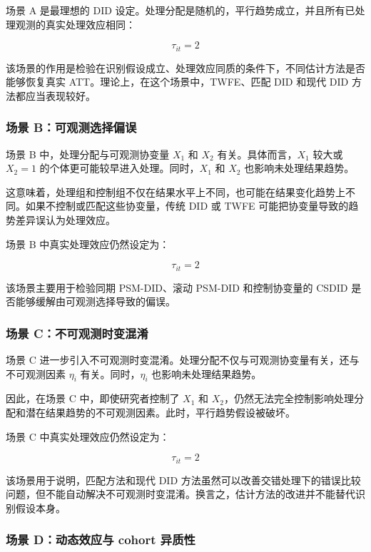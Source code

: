 \documentclass[
  fontset=windows]{ctexart}
\begin{document}
场景 A 是最理想的 DID
设定。处理分配是随机的，平行趋势成立，并且所有已处理观测的真实处理效应相同：

\[
\tau_{it}=2
\]

该场景的作用是检验在识别假设成立、处理效应同质的条件下，不同估计方法是否能够恢复真实
ATT。理论上，在这个场景中，TWFE、匹配 DID 和现代 DID
方法都应当表现较好。

\subsubsection{场景
B：可观测选择偏误}\label{ux573aux666f-bux53efux89c2ux6d4bux9009ux62e9ux504fux8bef}

场景 B 中，处理分配与可观测协变量 \(X_1\) 和 \(X_2\)
有关。具体而言，\(X_1\) 较大或 \(X_2=1\)
的个体更可能较早进入处理。同时，\(X_1\) 和 \(X_2\)
也影响未处理结果趋势。

这意味着，处理组和控制组不仅在结果水平上不同，也可能在结果变化趋势上不同。如果不控制或匹配这些协变量，传统
DID 或 TWFE 可能把协变量导致的趋势差异误认为处理效应。

场景 B 中真实处理效应仍然设定为：

\[
\tau_{it}=2
\]

该场景主要用于检验同期 PSM-DID、滚动 PSM-DID 和控制协变量的 CSDID
是否能够缓解由可观测选择导致的偏误。

\subsubsection{场景
C：不可观测时变混淆}\label{ux573aux666f-cux4e0dux53efux89c2ux6d4bux65f6ux53d8ux6df7ux6dc6}

场景 C
进一步引入不可观测时变混淆。处理分配不仅与可观测协变量有关，还与不可观测因素
\(\eta_i\) 有关。同时，\(\eta_i\) 也影响未处理结果趋势。

因此，在场景 C 中，即使研究者控制了 \(X_1\) 和
\(X_2\)，仍然无法完全控制影响处理分配和潜在结果趋势的不可观测因素。此时，平行趋势假设被破坏。

场景 C 中真实处理效应仍然设定为：

\[
\tau_{it}=2
\]

该场景用于说明，匹配方法和现代 DID
方法虽然可以改善交错处理下的错误比较问题，但不能自动解决不可观测时变混淆。换言之，估计方法的改进并不能替代识别假设本身。

\subsubsection{场景 D：动态效应与 cohort
异质性}\label{ux573aux666f-dux52a8ux6001ux6548ux5e94ux4e0e-cohort-ux5f02ux8d28ux6027}
\end{document}
